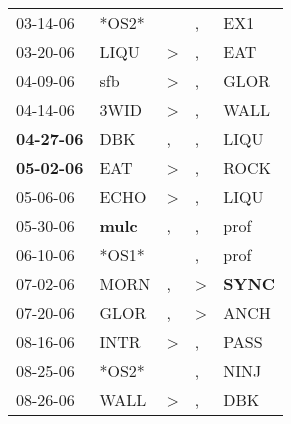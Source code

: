 \begin{supertabular}{p{0.07\textwidth}p{0.06\textwidth}p{0.02\textwidth}p{0.02\textwidth}p{0.06\textwidth}}
          03-14-06\textsuperscript{} &                            *OS2* &                  &                , &            EX1\textsuperscript{} \\
          03-20-06\textsuperscript{} &           LIQU\textsuperscript{} &     \textgreater &                , &            EAT\textsuperscript{} \\
          04-09-06\textsuperscript{} &            sfb\textsuperscript{} &     \textgreater &                , &           GLOR\textsuperscript{} \\
          04-14-06\textsuperscript{} &           3WID\textsuperscript{} &     \textgreater &                , &           WALL\textsuperscript{} \\
 \textbf{04-27-06\textsuperscript{}} &            DBK\textsuperscript{} &                , &                , &           LIQU\textsuperscript{} \\
 \textbf{05-02-06\textsuperscript{}} &            EAT\textsuperscript{} &     \textgreater &                , &           ROCK\textsuperscript{} \\
          05-06-06\textsuperscript{} &           ECHO\textsuperscript{} &     \textgreater &                , &           LIQU\textsuperscript{} \\
          05-30-06\textsuperscript{} &  \textbf{mulc\textsuperscript{}} &                , &                , &           prof\textsuperscript{} \\
          06-10-06\textsuperscript{} &                            *OS1* &                  &                , &           prof\textsuperscript{} \\
          07-02-06\textsuperscript{} &           MORN\textsuperscript{} &                , &     \textgreater &  \textbf{SYNC\textsuperscript{}} \\
          07-20-06\textsuperscript{} &           GLOR\textsuperscript{} &                , &     \textgreater &           ANCH\textsuperscript{} \\
          08-16-06\textsuperscript{} &           INTR\textsuperscript{} &     \textgreater &                , &           PASS\textsuperscript{} \\
          08-25-06\textsuperscript{} &                            *OS2* &                  &                , &           NINJ\textsuperscript{} \\
          08-26-06\textsuperscript{} &           WALL\textsuperscript{} &     \textgreater &                , &            DBK\textsuperscript{} \\

\end{supertabular}
